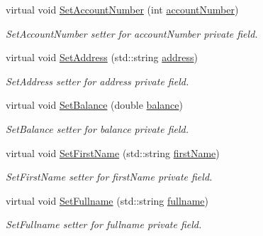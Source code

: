 \begin{DoxyCompactItemize}
\item 
virtual void \hyperlink{class_b_o_i_affc9e7e2a36214b3790f250b7108bb65_affc9e7e2a36214b3790f250b7108bb65}{Set\+Account\+Number} (int \hyperlink{class_b_o_i_a35c9fd6e938eb44ad4e076bc6a736851_a35c9fd6e938eb44ad4e076bc6a736851}{account\+Number})
\begin{DoxyCompactList}\small\item\em Set\+Account\+Number setter for account\+Number private field. \end{DoxyCompactList}\item 
virtual void \hyperlink{class_b_o_i_a00c9386c862cf2442968bf7fc30102b3_a00c9386c862cf2442968bf7fc30102b3}{Set\+Address} (std\+::string \hyperlink{class_b_o_i_ab9315fe76fd9f07551f5ae7899d33516_ab9315fe76fd9f07551f5ae7899d33516}{address})
\begin{DoxyCompactList}\small\item\em Set\+Address setter for address private field. \end{DoxyCompactList}\item 
virtual void \hyperlink{class_b_o_i_a416667693c10f5e4120eec97a9269348_a416667693c10f5e4120eec97a9269348}{Set\+Balance} (double \hyperlink{class_b_o_i_aa00a3d8baf3420647c40119b7fa4ed6f_aa00a3d8baf3420647c40119b7fa4ed6f}{balance})
\begin{DoxyCompactList}\small\item\em Set\+Balance setter for balance private field. \end{DoxyCompactList}\item 
virtual void \hyperlink{class_b_o_i_ae9042f87be085c2cec799981c30d7d19_ae9042f87be085c2cec799981c30d7d19}{Set\+First\+Name} (std\+::string \hyperlink{class_b_o_i_a12872fd8c15dbf833f78862b00579ed1_a12872fd8c15dbf833f78862b00579ed1}{first\+Name})
\begin{DoxyCompactList}\small\item\em Set\+First\+Name setter for first\+Name private field. \end{DoxyCompactList}\item 
virtual void \hyperlink{class_b_o_i_a93091f16610f1a1474aea31fd5f81ffd_a93091f16610f1a1474aea31fd5f81ffd}{Set\+Fullname} (std\+::string \hyperlink{class_b_o_i_a6d7c892a54bb6f7327cdc777081ab5f4_a6d7c892a54bb6f7327cdc777081ab5f4}{fullname})
\begin{DoxyCompactList}\small\item\em Set\+Fullname setter for fullname private field. \end{DoxyCompactList}\item 

\end{DoxyCompactItemize}
